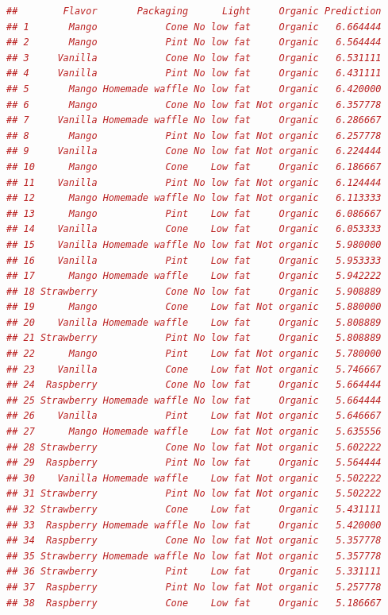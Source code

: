 \documentclass{article}
\begin{document}
\begin{lstlisting}[language=R]
##        Flavor       Packaging      Light     Organic Prediction
## 1       Mango            Cone No low fat     Organic   6.664444
## 2       Mango            Pint No low fat     Organic   6.564444
## 3     Vanilla            Cone No low fat     Organic   6.531111
## 4     Vanilla            Pint No low fat     Organic   6.431111
## 5       Mango Homemade waffle No low fat     Organic   6.420000
## 6       Mango            Cone No low fat Not organic   6.357778
## 7     Vanilla Homemade waffle No low fat     Organic   6.286667
## 8       Mango            Pint No low fat Not organic   6.257778
## 9     Vanilla            Cone No low fat Not organic   6.224444
## 10      Mango            Cone    Low fat     Organic   6.186667
## 11    Vanilla            Pint No low fat Not organic   6.124444
## 12      Mango Homemade waffle No low fat Not organic   6.113333
## 13      Mango            Pint    Low fat     Organic   6.086667
## 14    Vanilla            Cone    Low fat     Organic   6.053333
## 15    Vanilla Homemade waffle No low fat Not organic   5.980000
## 16    Vanilla            Pint    Low fat     Organic   5.953333
## 17      Mango Homemade waffle    Low fat     Organic   5.942222
## 18 Strawberry            Cone No low fat     Organic   5.908889
## 19      Mango            Cone    Low fat Not organic   5.880000
## 20    Vanilla Homemade waffle    Low fat     Organic   5.808889
## 21 Strawberry            Pint No low fat     Organic   5.808889
## 22      Mango            Pint    Low fat Not organic   5.780000
## 23    Vanilla            Cone    Low fat Not organic   5.746667
## 24  Raspberry            Cone No low fat     Organic   5.664444
## 25 Strawberry Homemade waffle No low fat     Organic   5.664444
## 26    Vanilla            Pint    Low fat Not organic   5.646667
## 27      Mango Homemade waffle    Low fat Not organic   5.635556
## 28 Strawberry            Cone No low fat Not organic   5.602222
## 29  Raspberry            Pint No low fat     Organic   5.564444
## 30    Vanilla Homemade waffle    Low fat Not organic   5.502222
## 31 Strawberry            Pint No low fat Not organic   5.502222
## 32 Strawberry            Cone    Low fat     Organic   5.431111
## 33  Raspberry Homemade waffle No low fat     Organic   5.420000
## 34  Raspberry            Cone No low fat Not organic   5.357778
## 35 Strawberry Homemade waffle No low fat Not organic   5.357778
## 36 Strawberry            Pint    Low fat     Organic   5.331111
## 37  Raspberry            Pint No low fat Not organic   5.257778
## 38  Raspberry            Cone    Low fat     Organic   5.186667

\end{lstlisting}
\end{document}
